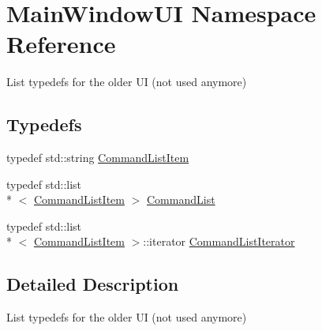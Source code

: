 \hypertarget{namespaceMainWindowUI}{\section{Main\-Window\-U\-I Namespace Reference}
\label{namespaceMainWindowUI}
}


List typedefs for the older U\-I (not used anymore)  


\subsection*{Typedefs}
\begin{DoxyCompactItemize}
\item 
typedef std\-::string \hyperlink{namespaceMainWindowUI_ab4a56a6d14c3fc1c53d1f1373a9033d3}{Command\-List\-Item}
\item 
typedef std\-::list\\*
$<$ \hyperlink{namespaceMainWindowUI_ab4a56a6d14c3fc1c53d1f1373a9033d3}{Command\-List\-Item} $>$ \hyperlink{namespaceMainWindowUI_a746ebba19502abcb8ef74beecf9c6acf}{Command\-List}
\item 
typedef std\-::list\\*
$<$ \hyperlink{namespaceMainWindowUI_ab4a56a6d14c3fc1c53d1f1373a9033d3}{Command\-List\-Item} $>$\-::iterator \hyperlink{namespaceMainWindowUI_acbc9d84cd79a821b6ff30f5ff94e9321}{Command\-List\-Iterator}
\end{DoxyCompactItemize}


\subsection{Detailed Description}
List typedefs for the older U\-I (not used anymore) 

